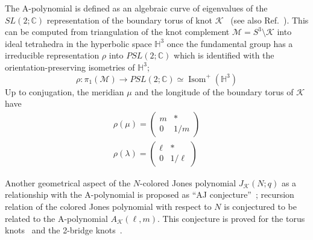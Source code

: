 \documentclass[12pt,reqno]{amsart}
\numberwithin{equation}{section}
\DeclareMathOperator{\Isom}{Isom}
\begin{document}
The A-polynomial is  defined as an algebraic curve
of eigenvalues of the $SL(2; \mathbb{C})$ representation of the
boundary torus of knot $\mathcal{K}$~\cite{CCGLS94a}
(see also Ref.~).
This can be computed from triangulation of the knot
complement $\mathcal{M}=S^3 \setminus \mathcal{K}$ into  ideal tetrahedra in the
hyperbolic space $\mathbb{H}^3$ once
the fundamental group has a irreducible representation $\rho$ into
$PSL(2;\mathbb{C})$ which
is identified with the
orientation-preserving isometries of $\mathbb{H}^3$;
\begin{equation*}
  \rho:
  \pi_1(\mathcal{M}) \to PSL(2; \mathbb{C}) \simeq
  \Isom^+(\mathbb{H}^3)
\end{equation*}
Up to conjugation, the meridian $\mu$ and the longitude of the
boundary torus of $\mathcal{K}$ have
\begin{gather*}
  \rho(\mu)
  =
  \begin{pmatrix}
    m & *
    \\
    0 & 1/m
  \end{pmatrix}
  \\[2mm]
%
  \rho(\lambda)
  =
  \begin{pmatrix}
    \ell & *
    \\
    0 & 1/ \ell
  \end{pmatrix}
\end{gather*}


Another geometrical aspect of the $N$-colored Jones polynomial 
$J_\mathcal{K}(N; q)$ as a
relationship with the A-polynomial
is
proposed as
``AJ conjecture''~\cite{GaroTQLe03a};
recursion relation of the colored Jones polynomial with respect to
$N$ is conjectured to be related to the
A-polynomial $A_\mathcal{K}(\ell, m)$.
This conjecture is proved for the torus knots~\cite{KHikami04a} and
the 2-bridge knots~\cite{TQLe04a}.
\end{document}
